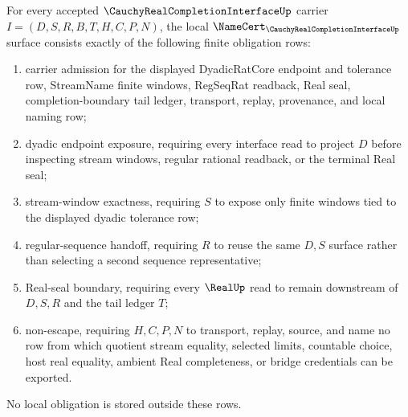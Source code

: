 \begin{theorem}
\label{thm:cauchy-real-completion-interface-namecert-obligations}
For every accepted $\CauchyRealCompletionInterfaceUp$ carrier $I=(D,S,R,B,T,H,C,P,N)$, the local $\NameCert_{\CauchyRealCompletionInterfaceUp}$ surface consists exactly of the following finite obligation rows:
\begin{enumerate}
\item carrier admission for the displayed DyadicRatCore endpoint and tolerance row, StreamName finite windows, RegSeqRat readback, Real seal, completion-boundary tail ledger, transport, replay, provenance, and local naming row;
\item dyadic endpoint exposure, requiring every interface read to project $D$ before inspecting stream windows, regular rational readback, or the terminal Real seal;
\item stream-window exactness, requiring $S$ to expose only finite windows tied to the displayed dyadic tolerance row;
\item regular-sequence handoff, requiring $R$ to reuse the same $D,S$ surface rather than selecting a second sequence representative;
\item Real-seal boundary, requiring every $\RealUp$ read to remain downstream of $D,S,R$ and the tail ledger $T$;
\item non-escape, requiring $H,C,P,N$ to transport, replay, source, and name no row from which quotient stream equality, selected limits, countable choice, host real equality, ambient Real completeness, or bridge credentials can be exported.
\end{enumerate}
No local obligation is stored outside these rows.
\end{theorem}
